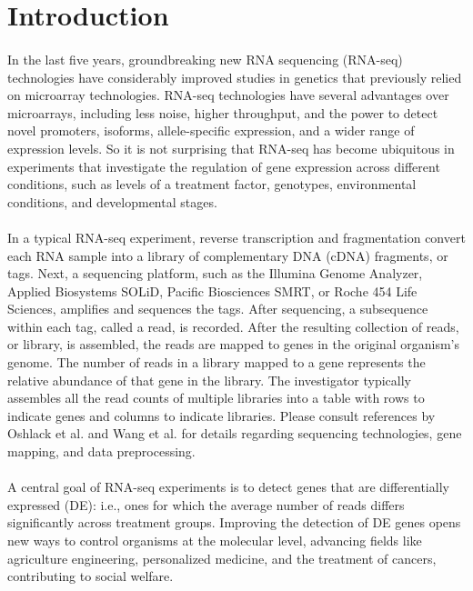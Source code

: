 \documentclass[10pt]{article}
\begin{document}
\section*{Introduction}

\paragraph{} \indent In the last five years, groundbreaking new RNA sequencing (RNA-seq) technologies have considerably improved studies in genetics that previously relied on microarray technologies. RNA-seq technologies have several advantages over microarrays, including less noise, higher throughput, and the power to detect novel promoters, isoforms, allele-specific expression, and a wider range of expression levels. So it is not surprising that RNA-seq has become ubiquitous in experiments that investigate the regulation of gene expression across different conditions, such as levels of a treatment factor, genotypes, environmental conditions, and developmental stages.

\paragraph{} \indent In a typical RNA-seq experiment, reverse transcription and fragmentation convert each RNA sample into a library of complementary DNA (cDNA) fragments, or tags. Next, a sequencing platform, such as the Illumina Genome Analyzer, Applied Biosystems SOLiD, Pacific Biosciences SMRT, or Roche 454 Life Sciences, amplifies and sequences the tags. After sequencing, a subsequence within each tag, called a read, is recorded. After the resulting collection of reads, or library, is assembled, the reads are mapped to genes in the original organism's genome. The number of reads in a library mapped to a gene represents the relative abundance of that gene in the library. The investigator typically assembles all the read counts of multiple libraries into a table with rows to indicate genes and columns to indicate libraries. Please consult references by Oshlack et al. \cite{oshlack} and Wang et al. \cite{wang} for details regarding sequencing technologies, gene mapping, and data preprocessing.

\paragraph{} \indent A central goal of RNA-seq experiments is to detect genes that are differentially expressed (DE): i.e., ones for which the average number of reads differs significantly across treatment groups. Improving the detection of DE genes opens new ways to control organisms at the molecular level, advancing fields like agriculture engineering, personalized medicine, and the treatment of cancers,
contributing to social welfare.
\end{document}
